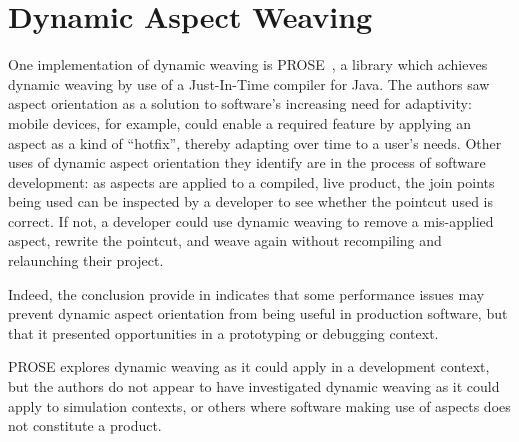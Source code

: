 

\section{Dynamic Aspect Weaving}\label{sec:dynamic_aop_review}

One implementation of dynamic weaving is
PROSE~\cite{popovici2002PROSE,popovici2003JITaspects}, a library which achieves
dynamic weaving by use of a Just-In-Time compiler for Java. The authors saw
aspect orientation as a solution to software's increasing need for adaptivity:
mobile devices, for example, could enable a required feature by applying an
aspect as a kind of ``hotfix'', thereby adapting over time to a user's needs.
Other uses of dynamic aspect orientation they identify are in the process of
software development: as aspects are applied to a compiled, live product, the
join points being used can be inspected by a developer to see whether the
pointcut used is correct. If not, a developer could use dynamic weaving to
remove a mis-applied aspect, rewrite the pointcut, and weave again without
recompiling and relaunching their project.

Indeed, the conclusion \citeauthor{popovici2003JITaspects} provide in
\cite{popovici2003JITaspects} indicates that some performance issues 
may prevent
dynamic aspect orientation from being useful in production software, but that
it presented opportunities in a prototyping or debugging context.

PROSE explores dynamic weaving as it could apply in a development context, but
the authors do not appear to have investigated dynamic weaving as it could apply
to simulation contexts, or others where software making use of aspects does not
constitute a product.

